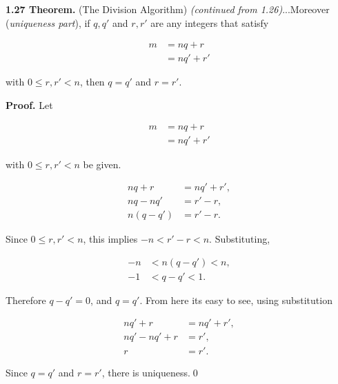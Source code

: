 \documentclass[12pt]{article}
\begin{document}
\noindent\textbf{1.27 Theorem.} (The Division Algorithm) \textit{(continued from 1.26)}...Moreover (\textit{uniqueness part}), if $q,q'$ and $r,r'$ are any integers that satisfy

\begin{align*}
m&=nq+r \\
&=nq'+r'
\end{align*} 

\noindent with $0\leq r,r' <n$, then $q=q'$ and $r=r'$.

\bigskip

\noindent\textbf{Proof.} Let 

\begin{align*}
m&=nq+r \\
&=nq'+r'
\end{align*}

\noindent with $0\leq r,r' <n$ be given.

\begin{align*}
nq+r &= nq'+r', \\
nq-nq' &= r'-r, \\
n(q-q') &= r'-r.
\end{align*}

\noindent Since $0\leq r,r' <n$, this implies $-n < r'-r < n$. Substituting,

\begin{align*}
-n &< n(q-q') < n, \\
 -1 &< q-q' < 1.
\end{align*}

\noindent Therefore $q-q'=0$, and $q=q'$. From here its easy to see, using substitution

\begin{align*}
nq'+r &= nq'+r', \\
nq'-nq'+r &= r', \\
r &= r'.
\end{align*}

\noindent Since $q=q'$ and $r=r'$, there is uniqueness.\qed
\end{document}
